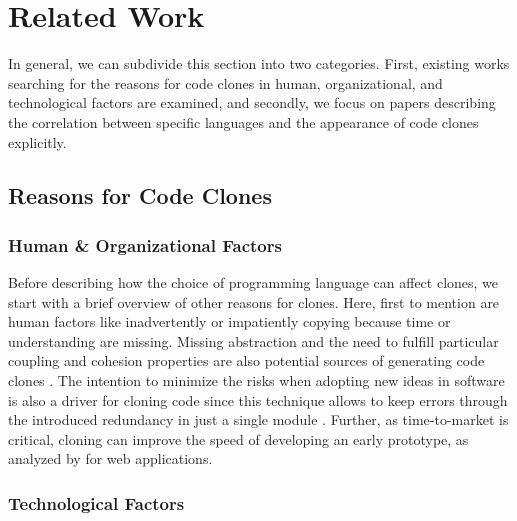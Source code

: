 
\section{Related Work}
\label{sec:related_work}

In general, we can subdivide this section into two categories. First, existing works searching for the reasons for code clones in human, organizational, and technological factors are examined, and secondly, we focus on papers describing the correlation between specific languages and the appearance of code clones explicitly.

\subsection{Reasons for Code Clones}
\label{sec:reasons_for_code_clones}

\subsubsection{Human \& Organizational Factors}

Before describing how the choice of programming language can affect clones, we start with a brief overview of other reasons for clones. Here, first to mention are human factors like inadvertently or impatiently copying because time or understanding are missing. Missing abstraction and the need to fulfill particular coupling and cohesion properties are also potential sources of generating code clones  \cite{kasper2006cloning}.
The intention to minimize the risks when adopting new ideas in software is also a driver for cloning code since this technique allows to keep errors through the introduced redundancy in just a single module  \cite{cordy2003comprehending}. Further, as time-to-market is critical, cloning can improve the speed of developing an early prototype, as analyzed by \cite{rajapakse2007using} for web applications.

\subsubsection{Technological Factors}

